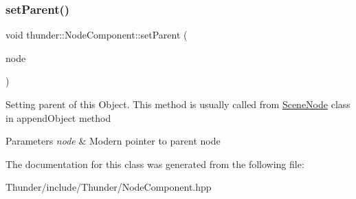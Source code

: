 \subsubsection{\texorpdfstring{set\+Parent()}{setParent()}}
{\footnotesize\ttfamily void thunder\+::\+Node\+Component\+::set\+Parent (\begin{DoxyParamCaption}\item[{const std\+::shared\+\_\+ptr$<$ \mbox{\hyperlink{classthunder_1_1_scene_node}{Scene\+Node}} $>$ \&}]{node }\end{DoxyParamCaption})}

Setting parent of this Object. This method is usually called from \mbox{\hyperlink{classthunder_1_1_scene_node}{Scene\+Node}} class in append\+Object method 
\begin{DoxyParams}{Parameters}
{\em node} & Modern pointer to parent node \\
\hline
\end{DoxyParams}


The documentation for this class was generated from the following file\+:\begin{DoxyCompactItemize}
\item 
Thunder/include/\+Thunder/Node\+Component.\+hpp\end{DoxyCompactItemize}
